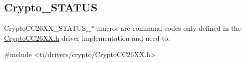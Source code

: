 \subsection{Crypto\+\_\+\+S\+T\+A\+T\+U\+S}
\label{group___crypto___s_t_a_t_u_s}
Crypto\+C\+C26\+X\+X\+\_\+\+S\+T\+A\+T\+U\+S\+\_\+$\ast$ macros are command codes only defined in the \hyperlink{_crypto_c_c26_x_x_8h}{Crypto\+C\+C26\+X\+X.\+h} driver implementation and need to\+: 
\begin{DoxyCode}
\textcolor{preprocessor}{#include <ti/drivers/crypto/CryptoCC26XX.h>}
\end{DoxyCode}
 